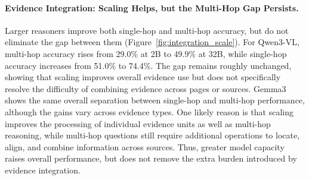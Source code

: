 \documentclass[11pt]{article}
\begin{document}
\paragraph{Evidence Integration: Scaling Helps, but the Multi-Hop Gap Persists.}
Larger reasoners improve both single-hop and multi-hop accuracy, but do not eliminate the gap between them (Figure~\ref{fig:integration_scale}). For Qwen3-VL, multi-hop accuracy rises from 29.0\% at 2B to 49.9\% at 32B, while single-hop accuracy increases from 51.0\% to 74.4\%. The gap remains roughly unchanged, showing that scaling improves overall evidence use but does not specifically resolve the difficulty of combining evidence across pages or sources. Gemma3 shows the same overall separation between single-hop and multi-hop performance, although the gains vary across evidence types. One likely reason is that scaling improves the processing of individual evidence units as well as multi-hop reasoning, while multi-hop questions still require additional operations to locate, align, and combine information across sources. Thus, greater model capacity raises overall performance, but does not remove the extra burden introduced by evidence integration.

\end{document}
